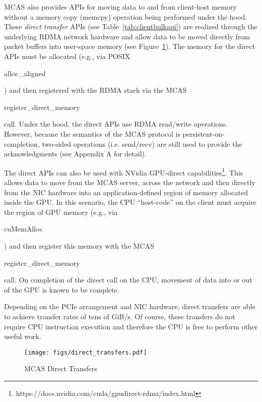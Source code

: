 \documentclass[letterpaper,twocolumn,10pt]{article}
\newcommand{\code}[1]{\begin{ttcodefont}#1\end{ttcodefont}}
\begin{document}
MCAS also provides APIs for moving data to and from client-host memory
without a memory copy (memcpy) operation being performed under the
hood.  These \textit{direct transfer} APIs 
(see Table~\ref{tab:clientbulkapi}) are realized through the
underlying RDMA network hardware and allow data to be moved directly
from packet buffers into user-space memory (see
Figure~\ref{fig:direct}).  The memory for the direct APIs must be
allocated (e.g., via POSIX \code{alloc\_aligned}) and then registered
with the RDMA stack via the MCAS \code{register\_direct\_memory} call.
Under the hood, the direct APIs use RDMA read/write operations.
However, because the semantics of the MCAS protocol is
persistent-on-completion, two-sided operations (i.e. send/recv) are
still used to provide the acknowledgments (see Appendix A for detail).

The direct APIs can also be used with NVidia GPU-direct capabilities\footnote{https://docs.nvidia.com/cuda/gpudirect-rdma/index.html}.
This allows data to move from the MCAS server, across the network and
then directly from the NIC hardware into an application-defined region
of memory allocated inside the GPU.
In this scenario, 
the CPU
``host-code'' on the client must acquire the region of GPU memory
(e.g., via \code{cuMemAlloc}) and then register this memory with the
MCAS \code{register\_direct\_memory} call.  On completion of the
direct call on the CPU, movement of data into or out of the GPU is
known to be complete.

Depending on the PCIe arrangement and NIC hardware, direct transfers
are able to achieve transfer rates of tens of GiB/s.  Of course, these
transfers do not require CPU instruction execution and therefore the CPU is
free to perform other useful work.

\begin{figure}
\centering
\texttt{[image: figs/direct\_transfers.pdf]}
\caption{MCAS Direct Transfers}
\label{fig:direct}
\end{figure}
\end{document}
